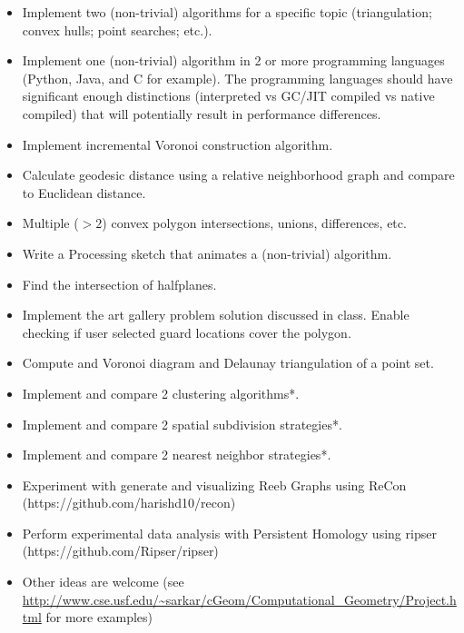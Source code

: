 \documentclass[a4paper,12pt]{article}
\begin{document}

\begin{itemize}
    \item Implement two (non-trivial) algorithms for a specific topic (triangulation; convex hulls; point searches; etc.).
    \item Implement one (non-trivial) algorithm in 2 or more programming languages (Python, Java, and C for example). The programming languages should have significant enough distinctions (interpreted vs GC/JIT compiled vs native compiled) that will potentially result in performance differences.
    \item Implement incremental Voronoi construction algorithm.
    \item Calculate geodesic distance using a relative neighborhood graph and compare to Euclidean distance.
    \item Multiple ($>2$) convex polygon intersections, unions, differences, etc.
    \item Write a Processing sketch that animates a (non-trivial) algorithm. 
    \item Find the intersection of halfplanes.
    \item Implement the art gallery problem solution discussed in class. Enable checking if user selected guard locations cover the polygon.
    \item Compute and Voronoi diagram and Delaunay triangulation of a point set.
    \item Implement and compare 2 clustering algorithms*.
	\item Implement and compare 2 spatial subdivision strategies*.
	\item Implement and compare 2 nearest neighbor strategies*.
	\item Experiment with generate and visualizing Reeb Graphs using ReCon (https://github.com/harishd10/recon)
	\item Perform experimental data analysis with Persistent Homology using ripser (https://github.com/Ripser/ripser)
    \item Other ideas are welcome (see \url{http://www.cse.usf.edu/~sarkar/cGeom/Computational_Geometry/Project.html} for more examples)
\end{itemize}
\end{document}
